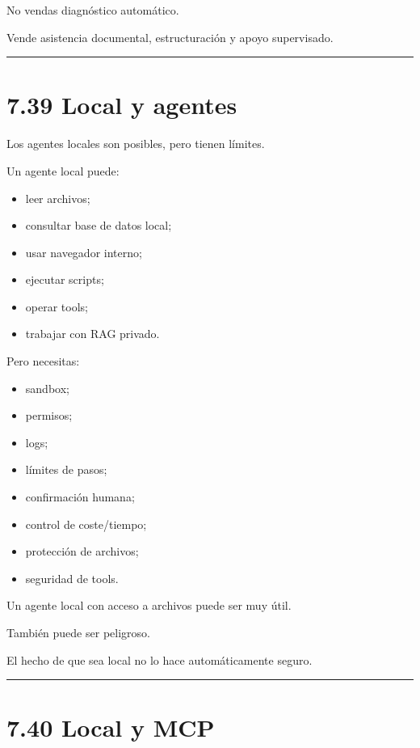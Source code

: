 No vendas diagnóstico automático.

Vende asistencia documental, estructuración y apoyo supervisado.

\begin{center}\rule{0.5\linewidth}{0.5pt}\end{center}

\section{7.39 Local y agentes}\label{local-y-agentes}

Los agentes locales son posibles, pero tienen límites.

Un agente local puede:

\begin{itemize}
\tightlist
\item
  leer archivos;
\item
  consultar base de datos local;
\item
  usar navegador interno;
\item
  ejecutar scripts;
\item
  operar tools;
\item
  trabajar con RAG privado.
\end{itemize}

Pero necesitas:

\begin{itemize}
\tightlist
\item
  sandbox;
\item
  permisos;
\item
  logs;
\item
  límites de pasos;
\item
  confirmación humana;
\item
  control de coste/tiempo;
\item
  protección de archivos;
\item
  seguridad de tools.
\end{itemize}

Un agente local con acceso a archivos puede ser muy útil.

También puede ser peligroso.

El hecho de que sea local no lo hace automáticamente seguro.

\begin{center}\rule{0.5\linewidth}{0.5pt}\end{center}

\section{7.40 Local y MCP}\label{local-y-mcp}

